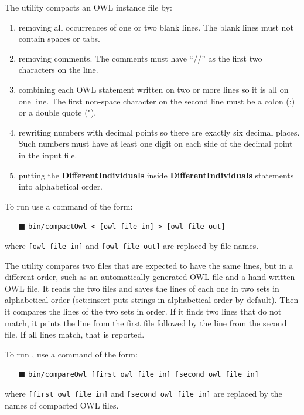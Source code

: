 The  utility compacts an OWL instance file by:
\begin{enumerate}
\item removing all occurrences of one or two blank lines. The blank lines
   must not contain spaces or tabs.
\item removing comments. The comments must have ``//'' as the first two
   characters on the line.
\item combining each OWL statement written on two or more lines so it is
   all on one line. The first non-space character on the second line
   must be a colon (:) or a double quote (").
\item rewriting numbers with decimal points so there are exactly six decimal
   places. Such numbers must have at least one digit on each side of the
   decimal point in the input file.
\item putting the \textbf{DifferentIndividuals} inside \textbf{DifferentIndividuals} statements
   into alphabetical order.
\end{enumerate}
To run  use a command of the form:
\begin{itemize}
 \item[\textcolor{BrickRed}{$\blacksquare$}] \texttt{bin/compactOwl < [owl file in] > [owl file out]}
\end{itemize}

where \texttt{[owl file in]} and \texttt{[owl file out]} are replaced by file names.

The  utility compares two files that are expected to have the
same lines, but in a different order, such as an automatically generated
OWL file and a hand-written OWL file. It reads the two files and saves the
lines of each one in two sets in alphabetical order (set::insert puts
strings in alphabetical order by default). Then it compares the lines of
the two sets in order. If it finds two lines that do not match, it prints
the line from the first file followed by the line from the second file.  If
all lines match, that is reported.

To run , use a command of the form:
\begin{itemize}
 \item[\textcolor{BrickRed}{$\blacksquare$}] \texttt{bin/compareOwl [first owl file in] [second owl file in]}
\end{itemize}

where \texttt{[first owl file in]} and \texttt{[second owl file in]} are replaced by the
names of compacted OWL files.
